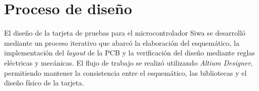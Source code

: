 \documentclass[journal,trans]{IEEEtran}
\begin{document}

\section{Proceso de diseño}


El diseño de la tarjeta de pruebas para el microcontrolador Siwa se desarrolló mediante un proceso iterativo que abarcó la elaboración del esquemático, la implementación del \textit{layout} de la PCB y la verificación del diseño mediante reglas eléctricas y mecánicas. El flujo de trabajo se realizó utilizando \textit{Altium Designer}, permitiendo mantener la consistencia entre el esquemático, las bibliotecas y el diseño físico de la tarjeta.
\end{document}
